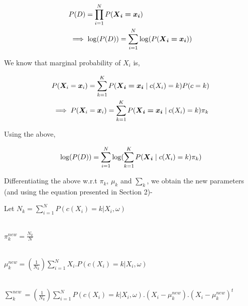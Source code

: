 \documentclass[12pt]{article}
\begin{document}
\begin{gather*} 
\begin{aligned}
    & P(D) =  \prod_{i=1}^{N} P(\bm{{\boldsymbol X}_i = {\boldsymbol x}_{i}}) \\ 
    & \implies \log(P(D)) = \sum_{i=1}^{N} \log(P(\bm{{\boldsymbol X}_i = {\boldsymbol x}_{i}})) \\ 
\end{aligned}
\end{gather*}

We know that marginal probability of $X_i$ is,

\begin{gather*} 
\begin{aligned}
    & P({\boldsymbol X}_i = {\boldsymbol x}_i) = \sum_{k=1}^{K} P(\bm{{\boldsymbol X}_{i} = {\boldsymbol x}_i} \mid c(X_{i}) = k) P(c = k) \\
    & \implies P({\boldsymbol X}_i = {\boldsymbol x}_i) = \sum_{k=1}^{K} P(\bm{{\boldsymbol X}_{i} = {\boldsymbol x}_i} \mid c(X_{i}) = k) \pi_k \\
\end{aligned}
\end{gather*}

Using the above,

\begin{gather*} 
\begin{aligned}
    & \log(P(D)) = \sum_{i=1}^{N} \log(\sum_{k=1}^{K} P(\bm{{\boldsymbol X}_{i}} \mid c(X_{i}) = k) \pi_k) \\
\end{aligned}
\end{gather*}

Differentiating the above w.r.t $\pi_k$, $\mu_k$ and $\sum_k$, we obtain the new parameters (and using the equation presented in Section 2)- 

\begin{center}
    Let $N_k = \sum_{i=1}^N P(c(X_i) = k| X_i, \omega)$ \\ 
      \\
\end{center}
\begin{center}
$\pi_k^{new} = \frac{N_k}{N}$ \\ 
\end{center}
\begin{center}      \\
    $\mu_k^{new} = (\frac{1}{ N_k}) \sum_{i=1}^N X_i. P(c(X_i) = k| X_i, \omega)$ \\ 
    
      \\
\end{center}  
\begin{center}
    $\sum_k^{new} = (\frac{1}{ N_k}) \sum_{i=1}^N P(c(X_i) = k| X_i, \omega). (X_i - \mu_k^{new}). (X_i - \mu_k^{new})^t$
\end{center}
\end{document}
